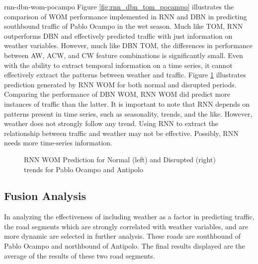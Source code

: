 rnn-dbn-wom-pocampo
Figure \ref{fig:rnn_dbn_tom_pocampo} illustrates the comparison of WOM performance implemented in RNN and DBN in predicting southbound traffic of Pablo Ocampo in the wet season. Much like TOM, RNN outperforms DBN and effectively predicted traffic with just information on weather variables. However, much like DBN TOM, the differences in performance between AW, ACW, and CW feature combinations is significantly small. Even with the ability to extract temporal information on a time series, it cannot effectively extract the patterns between weather and traffic. Figure \ref{fig:RNN_WOM_normal_disrption_pocampo_antipolo_wet} illustrates prediction generated by RNN WOM for both normal and disrupted periods. Comparing the performance of DBN WOM, RNN WOM did predict more instances of traffic than the latter. It is important to note that RNN depends on patterns present in time series, such as seasonality, trends, and the like. However, weather does not strongly follow any trend. Using RNN to extract the relationship between traffic and weather may not be effective. Possibly, RNN needs more time-series information. 

\begin{figure}[h]
  \centering
  \captionsetup{justification=centering}
  \caption{RNN WOM Prediction for Normal (left) and Disrupted (right) trends for Pablo Ocampo and Antipolo}
  \label{fig:RNN_WOM_normal_disrption_pocampo_antipolo_wet}
\end{figure}

\subsection{Fusion Analysis}
In analyzing the effectiveness of including weather as a factor in predicting traffic, the road segments which are strongly correlated with weather variables, and are more dynamic are selected in further analysis. These roads are southbound of Pablo Ocampo and northbound of Antipolo. The final results displayed are the average of the results of these two road segments.

